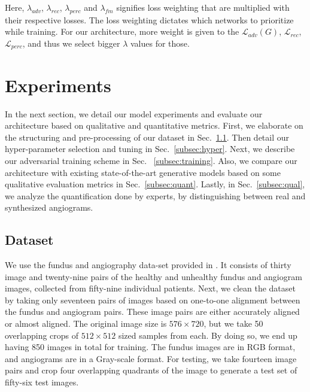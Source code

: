 \documentclass[a4paper,conference]{IEEEtran}
\begin{document}
Here, $\lambda_{adv}$, $\lambda_{rec}$, $\lambda_{perc}$ and $\lambda_{fm}$ signifies loss weighting that are multiplied with their respective losses. The loss weighting dictates which networks to prioritize while training. For our architecture, more weight is given to the $\mathcal{L}_{adv}(G)$, $\mathcal{L}_{rec}$, $\mathcal{L}_{perc}$, and thus we select bigger $\lambda$ values for those. 

\section{Experiments}
In the next section, we detail our model experiments and evaluate our architecture based on qualitative and quantitative metrics. First, we elaborate on the structuring and pre-processing of our dataset in Sec.~\ref{subsec:dataset}. Then detail our hyper-parameter selection and tuning in Sec.~\ref{subsec:hyper}. Next, we describe our adversarial training scheme in Sec. ~\ref{subsec:training}. Also, we compare our architecture with existing state-of-the-art generative models based on some qualitative evaluation metrics in Sec.~\ref{subsec:quant}. Lastly, in Sec.~\ref{subsec:qual},  we analyze the quantification done by experts, by distinguishing between real and synthesized angiograms. 
\subsection{Dataset}
\label{subsec:dataset}
We use the fundus and angiography data-set provided in \cite{hajeb2012diabetic}. It consists of thirty image and twenty-nine pairs of the healthy and unhealthy fundus and angiogram images, collected from fifty-nine individual patients. Next, we clean the dataset by taking only seventeen pairs of images based on one-to-one alignment between the fundus and angiogram pairs. These image pairs are either accurately aligned or almost aligned. The original image size is $576\times720$, but we take 50 overlapping crops of $512\times512$  sized samples from each. By doing so, we end up having  850 images in total for training. The fundus images are in RGB format, and angiograms are in a Gray-scale format. For testing, we take fourteen image pairs and crop four overlapping quadrants of the image to generate a test set of fifty-six test images.
\end{document}
